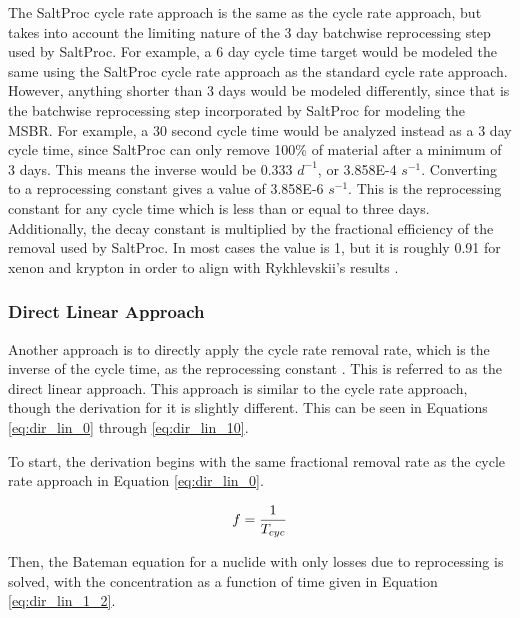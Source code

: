 The SaltProc cycle rate approach is the same as the cycle rate approach, but takes into account the limiting nature of the 3 day batchwise reprocessing step used by SaltProc. For example, a 6 day cycle time target would be modeled the same using the SaltProc cycle rate approach as the standard cycle rate approach. However, anything shorter than 3 days would be modeled differently, since that is the batchwise reprocessing step incorporated by SaltProc for modeling the MSBR. For example, a 30 second cycle time would be analyzed instead as a 3 day cycle time, since SaltProc can only remove 100\% of material after a minimum of 3 days. This means the inverse would be 0.333 $d^{-1}$, or 3.858E-4 $s^{-1}$. Converting to a reprocessing constant gives a value of 3.858E-6 $s^{-1}$. This is the reprocessing constant for any cycle time which is less than or equal to three days. Additionally, the decay constant is multiplied by the fractional efficiency of the removal used by SaltProc. In most cases the value is 1, but it is roughly 0.91 for xenon and krypton in order to align with Rykhlevskii's results \cite{rykhlevskii_fuel_2020}.

\subsubsection{Direct Linear Approach}
\label{s:DL}

Another approach is to directly apply the cycle rate removal rate, which is the inverse of the cycle time, as the reprocessing constant \cite{hombourger_eql0d_2020}. This is referred to as the direct linear approach. This approach is similar to the cycle rate approach, though the derivation for it is slightly different. This can be seen in Equations \eqref{eq:dir_lin_0} through \eqref{eq:dir_lin_10}.%

To start, the derivation begins with the same fractional removal rate as the cycle rate approach in Equation \eqref{eq:dir_lin_0}.

\begin{equation} \hfill
f = \frac{1}{T_{cyc}}
\hfill\label{eq:dir_lin_0} \end{equation}

Then, the Bateman equation for a nuclide with only losses due to reprocessing is solved, with the concentration as a function of time given in Equation \eqref{eq:dir_lin_1_2}.



